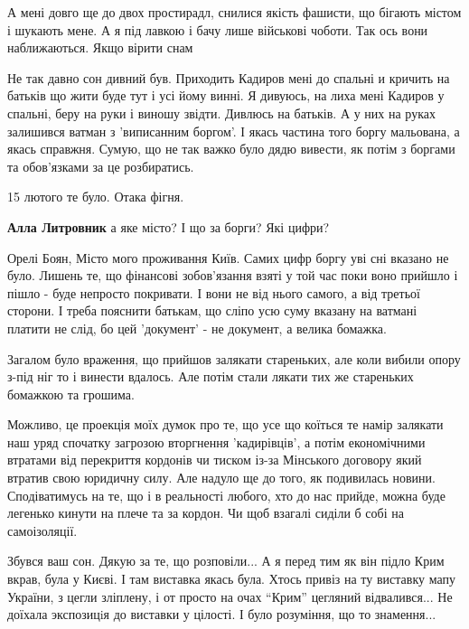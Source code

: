 \begin{itemize}

А мені довго ще до двох простирадл, снилися якість фашисти, що бігають містом і
шукають мене. А я під лавкою і бачу лише військові чоботи. Так ось вони
наближаються. Якщо вірити снам


Не так давно сон дивний був. Приходить Кадиров мені до спальні и кричить на
батьків що жити буде тут і усі йому винні. Я дивуюсь, на лиха мені Кадиров у
спальні, беру на руки і виношу звідти. Дивлюсь на батьків. А у них на руках
залишився ватман з 'виписанним боргом'. І якась частина того боргу мальована, а
якась справжня. Сумую, що не так важко було дядю вивести, як потім з боргами та
обов'язками за це розбиратись.

15 лютого те було. Отака фігня.

\begin{itemize} %
\textbf{Алла Литровник} а яке місто? І що за борги? Які цифри?


Орелі Боян, Місто мого проживання Київ. Самих цифр боргу уві сні вказано не
було. Лишень те, що фінансові зобов'язання взяті у той час поки воно прийшло і
пішло - буде непросто покривати. І вони не від нього самого, а від третьої
сторони. І треба пояснити батькам, що сліпо усю суму вказану на ватмані платити
не слід, бо цей 'документ' - не документ, а велика бомажка.

Загалом було враження, що прийшов залякати стареньких, але коли вибили опору
з-під ніг то і винести вдалось. Але потім стали лякати тих же стареньких
бомажкою та грошима.

Можливо, це проекція моїх думок про те, що усе що коїться те намір залякати наш
уряд спочатку загрозою вторгнення 'кадирівців', а потім економічними втратами
від перекриття кордонів чи тиском із-за Мінського договору який втратив свою
юридичну силу. Але надуло ще до того, як подивилась новини. Сподіватимусь на
те, що і в реальності любого, хто до нас прийде, можна буде легенько кинути на
плече та за кордон. Чи щоб взагалі сиділи б собі на самоізоляції.

\end{itemize} %


Збувся ваш сон. Дякую за те, що розповіли... А я перед тим як він підло Крим
вкрав, була у Києві. І там виставка якась була. Хтось привіз на ту виставку
мапу України, з цегли зліплену, і от просто на очах \enquote{Крим} цегляний
відвалився... Не доїхала экспозицiя до виставки у цілості. І було розуміння, що
то знамення...


\end{itemize}
